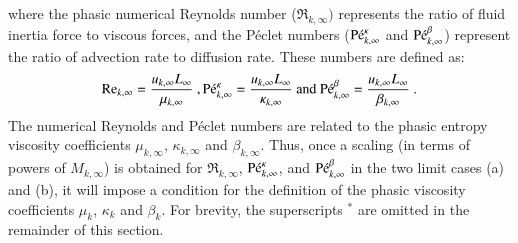 \documentclass[preprint,10pt]{elsarticle}
\begin{document}
%
where the phasic numerical Reynolds number ($\Re_{k,\infty})$ represents the ratio of fluid inertia force to viscous forces, and the P\'eclet numbers ($\textrm{P\'e}_{k,\infty}^\kappa$ and $\textrm{P\'e}_{k,\infty}^\beta$) represent the ratio of advection rate to diffusion rate. These numbers are defined as:
%
\begin{equation}
\label{eq:ref_numb}
\Re_{k,\infty} = \frac{u_{k,\infty} L_\infty}{\mu_{k,\infty}} \ ,
\Pe_{k,\infty}^\kappa = \frac{u_{k,\infty} L_\infty}{\kappa_{k,\infty}} \text{ and }
\Pe_{k,\infty}^\beta = \frac{u_{k,\infty} L_\infty}{\beta_{k,\infty}} \ .
\end{equation}
%
The numerical Reynolds and P\'eclet numbers are related to the phasic entropy 
viscosity coefficients $\mu_{k,\infty}$, $\kappa_{k,\infty}$ and $\beta_{k,\infty}$. Thus, once a scaling (in terms of powers of $M_{k,\infty}$) 
is obtained for $\Re_{k,\infty}$, $\textrm{P\'e}_{k,\infty}^\kappa$, and $\textrm{P\'e}_{k,\infty}^\beta$ in the two limit cases (a) and (b), it will impose a condition for the definition of the phasic viscosity coefficients $\mu_k$, $\kappa_k$ and $\beta_k$. For brevity, the superscripts $^*$ are omitted in the remainder of this section. 

\end{document}
